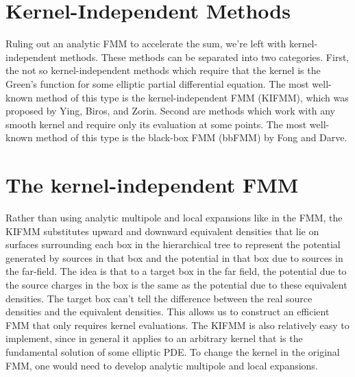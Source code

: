 \documentclass[11pt, oneside]{article}   	%
\begin{document}
\section{Kernel-Independent Methods}
Ruling out an analytic FMM to accelerate the sum, we're left with kernel-independent methods. These methods can be separated into two categories. First, the not so kernel-independent methods which require that the kernel is the Green's function for some elliptic partial differential equation. The most well-known method of this type is the kernel-independent FMM (KIFMM), which was proposed by Ying, Biros, and Zorin. Second are methods which work with any smooth kernel and require only its evaluation at some points. The most well-known method of this type is the black-box FMM (bbFMM) by Fong and Darve.


\section{The kernel-independent FMM}
Rather than using analytic multipole and local expansions like in the FMM, the KIFMM substitutes upward and downward equivalent densities that lie on surfaces surrounding each box in the hierarchical tree to represent the potential generated by sources in that box and the potential in that box due to sources in the far-field. The idea is that to a target box in the far field, the potential due to the source charges in the box is the same as the potential due to these equivalent densities. The target box can't tell the difference between the real source densities and the equivalent densities. This allows us to construct an efficient FMM that only requires kernel evaluations. The KIFMM is also relatively easy to implement, since in general it applies to an arbitrary kernel that is the fundamental solution of some elliptic PDE. To change the kernel in the original FMM, one would need to develop analytic multipole and local expansions.
\end{document}
